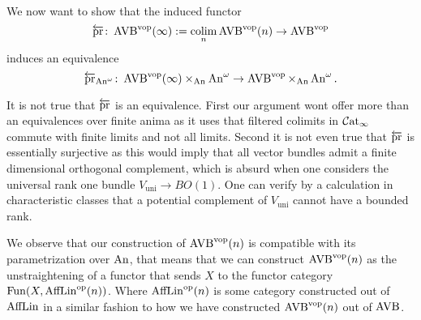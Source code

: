     We now want to show that the induced functor 
    \[
    \overleftarrow{\mathrm{pr}} \colon \operatorname{AVB}^{\mathrm{vop}}(\infty) := \operatorname*{colim}_n \operatorname{AVB}^{\mathrm{vop}}(n) \to \operatorname{AVB}^{\mathrm{vop}}   
    \]
    induces an equivalence 
    \[
    \overleftarrow{\mathrm{pr}}_{\operatorname{An}^\omega} \colon \operatorname{AVB}^{\mathrm{vop}}(\infty) \times_{\operatorname{An}} \operatorname{An}^\omega \to \operatorname{AVB}^{\mathrm{vop}} \times_{\operatorname{An}} \operatorname{An}^\omega.
    \]
\begin{remark}
    It is not true that $\overleftarrow{\mathrm{pr}}$ is an equivalence. First our argument 
    wont offer more than an equivalences over finite anima as it uses that 
    filtered colimits in $\mathcal{C}\mathrm{at}_{\infty}$ commute with finite limits and not all limits. Second it is 
    not even true that $\overleftarrow{\mathrm{pr}}$ is essentially surjective as this would imply that 
    all vector bundles admit a finite dimensional orthogonal complement, which is absurd when one considers 
    the universal rank one bundle $V_{\mathrm{uni}} \to BO(1)$.
    One can verify by a calculation in characteristic classes that a potential complement of 
    $V_\mathrm{uni}$ cannot have a bounded rank.
\end{remark}

    We observe that our construction of $\operatorname{AVB}^{\mathrm{vop}}(n)$ is compatible with its parametrization 
    over $\operatorname{An}$, that means that we can construct $\operatorname{AVB}^{\mathrm{vop}}(n)$ as the unstraightening of a functor 
    that sends $X$ to the functor category $\operatorname{Fun}(X, \operatorname{AffLin}^{\mathrm{op}}(n))$. Where $\operatorname{AffLin}^{\mathrm{op}}(n)$ is some 
    category constructed out of $\operatorname{AffLin}$ in a similar fashion to how we have constructed $\operatorname{AVB}^{\mathrm{vop}}(n)$
    out of $\operatorname{AVB}$. 

